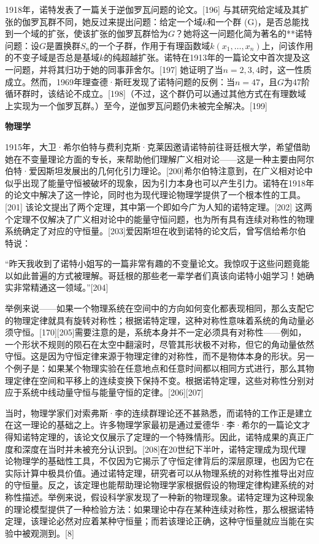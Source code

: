1918年，诺特发表了一篇关于逆伽罗瓦问题的论文。[196] 与其研究给定域及其扩张的伽罗瓦群不同，她反过来提出问题：给定一个域$k$和一个群 (G)，是否总能找到一个域的扩张，使该扩张的伽罗瓦群恰为$G$？她将这一问题化简为著名的**诺特问题：设$G$是置换群$S_n$的一个子群，作用于有理函数域$k(x_1, \ldots, x_n)$上，问该作用的不变子域是否总是基域$k$的纯超越扩张。诺特在1913年的一篇论文中首次提及这一问题，并将其归功于她的同事菲舍尔。[197] 她证明了当$n = 2, 3, 4$时，这一性质成立。然而，1969年理查德·斯旺发现了诺特问题的反例：当$n = 47$，且$G$为47阶循环群时，该结论不成立。[198]（不过，这个群仍可以通过其他方式在有理数域上实现为一个伽罗瓦群。）至今，逆伽罗瓦问题仍未被完全解决。[199]

\textbf{物理学}

1915年，大卫·希尔伯特与费利克斯·克莱因邀请诺特前往哥廷根大学，希望借助她在不变量理论方面的专长，来帮助他们理解广义相对论——这是一种主要由阿尔伯特·爱因斯坦发展出的几何化引力理论。[200]希尔伯特注意到，在广义相对论中似乎出现了能量守恒被破坏的现象，因为引力本身也可以产生引力。诺特在1918年的论文中解决了这一悖论，同时也为现代理论物理学提供了一个根本性的工具。[201] 该论文提出了两个定理，其中第一个即如今广为人知的诺特定理。[202] 这两个定理不仅解决了广义相对论中的能量守恒问题，也为所有具有连续对称性的物理系统确定了对应的守恒量。[203]爱因斯坦在收到诺特的论文后，曾写信给希尔伯特说：

“昨天我收到了诺特小姐写的一篇非常有趣的不变量论文。我惊叹于这些问题竟能以如此普遍的方式被理解。哥廷根的那些老一辈学者们真该向诺特小姐学习！她确实非常精通这一领域。”[204]

举例来说——如果一个物理系统在空间中的方向如何变化都表现相同，那么支配它的物理定律就具有旋转对称性；根据诺特定理，这种对称性意味着系统的角动量必须守恒。[170][205]需要注意的是，系统本身并不一定必须具有对称性——例如，一个形状不规则的陨石在太空中翻滚时，尽管其形状极不对称，但它的角动量依然守恒。这是因为守恒定律来源于物理定律的对称性，而不是物体本身的形状。另一个例子是：如果某个物理实验在任意地点和任意时间都以相同方式进行，那么其物理定律在空间和平移上的连续变换下保持不变。根据诺特定理，这些对称性分别对应于系统中线动量守恒与能量守恒的定律。[206][207]

当时，物理学家们对索弗斯·李的连续群理论还不甚熟悉，而诺特的工作正是建立在这一理论的基础之上。许多物理学家最初是通过爱德华·李·希尔的一篇论文才得知诺特定理的，该论文仅展示了定理的一个特殊情形。因此，诺特成果的真正广度和深度在当时并未被充分认识到。[208]在20世纪下半叶，诺特定理成为现代理论物理学的基础性工具，不仅因为它揭示了守恒定律背后的深层原理，也因为它在实际计算中极具价值。通过诺特定理，研究者可以从物理系统的对称性推导出对应的守恒量。反之，该定理也能帮助理论物理学家根据假设的物理定律构建系统的对称性描述。举例来说，假设科学家发现了一种新的物理现象。诺特定理为这种现象的理论模型提供了一种检验方法：如果理论中存在某种连续对称性，那么根据诺特定理，该理论必然对应着某种守恒量；而若该理论正确，这种守恒量就应当能在实验中被观测到。[8]
